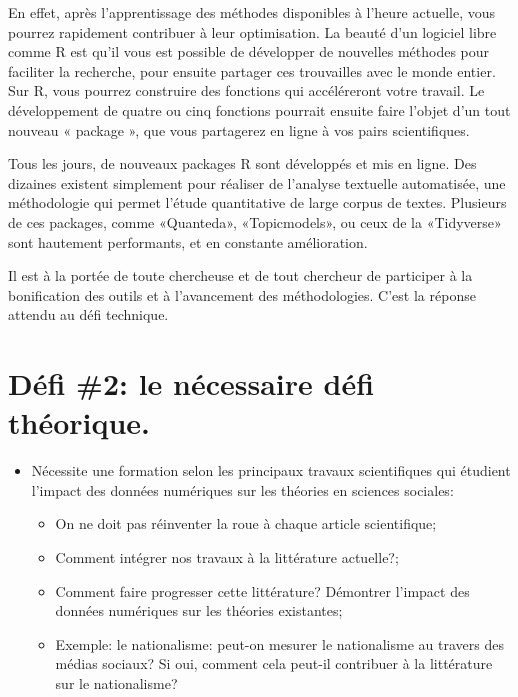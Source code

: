 \documentclass[
  letterpaper,
]{scrbook}
\providecommand{\tightlist}{%
  \setlength{\itemsep}{0pt}\setlength{\parskip}{0pt}}\usepackage{longtable,booktabs,array}
\begin{document}
En effet, après l'apprentissage des méthodes disponibles à l'heure
actuelle, vous pourrez rapidement contribuer à leur optimisation. La
beauté d'un logiciel libre comme R est qu'il vous est possible de
développer de nouvelles méthodes pour faciliter la recherche, pour
ensuite partager ces trouvailles avec le monde entier. Sur R, vous
pourrez construire des fonctions qui accéléreront votre travail. Le
développement de quatre ou cinq fonctions pourrait ensuite faire l'objet
d'un tout nouveau « package », que vous partagerez en ligne à vos pairs
scientifiques.

Tous les jours, de nouveaux packages R sont développés et mis en ligne.
Des dizaines existent simplement pour réaliser de l'analyse textuelle
automatisée, une méthodologie qui permet l'étude quantitative de large
corpus de textes. Plusieurs de ces packages, comme «Quanteda»,
«Topicmodels», ou ceux de la «Tidyverse» sont hautement performants, et
en constante amélioration.

Il est à la portée de toute chercheuse et de tout chercheur de
participer à la bonification des outils et à l'avancement des
méthodologies. C'est la réponse attendu au défi technique.

\hypertarget{duxe9fi-2-le-nuxe9cessaire-duxe9fi-thuxe9orique.}{%
\section{Défi \#2: le nécessaire défi
théorique.}\label{duxe9fi-2-le-nuxe9cessaire-duxe9fi-thuxe9orique.}}

\begin{itemize}
\tightlist
\item
  Nécessite une formation selon les principaux travaux scientifiques qui
  étudient l'impact des données numériques sur les théories en sciences
  sociales:

  \begin{itemize}
  \tightlist
  \item
    On ne doit pas réinventer la roue à chaque article scientifique;
  \item
    Comment intégrer nos travaux à la littérature actuelle?;
  \item
    Comment faire progresser cette littérature? Démontrer l'impact des
    données numériques sur les théories existantes;
  \item
    Exemple: le nationalisme: peut-on mesurer le nationalisme au travers
    des médias sociaux? Si oui, comment cela peut-il contribuer à la
    littérature sur le nationalisme?
  \end{itemize}
\end{itemize}
\end{document}
